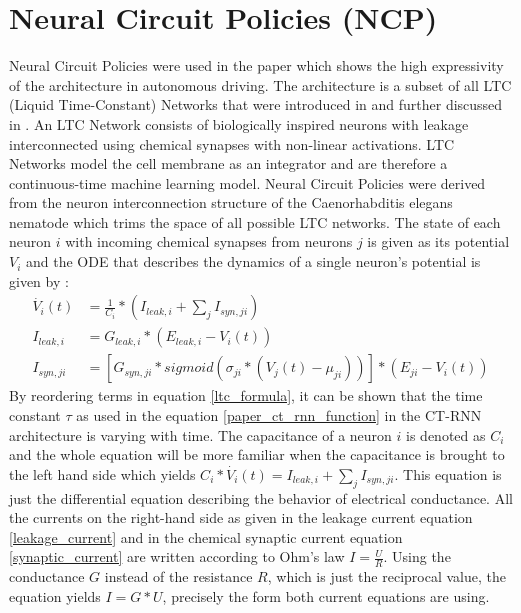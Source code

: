 \documentclass[draft,final]{vutinfth} %
\begin{document}
    \section{Neural Circuit Policies (NCP)} \label{ncp}
    Neural Circuit Policies were used in the paper \cite{NCP} which shows the high expressivity of the architecture in autonomous driving.
    The architecture is a subset of all LTC (Liquid Time-Constant) Networks that were introduced in \cite{LTCFormulas} and further discussed in \cite{LTCNetworks}.
    An LTC Network consists of biologically inspired neurons with leakage interconnected using chemical synapses with non-linear activations.
    LTC Networks model the cell membrane as an integrator and are therefore a continuous-time machine learning model.
    Neural Circuit Policies were derived from the neuron interconnection structure of the Caenorhabditis elegans nematode \cite[p. 3]{NCP} which trims the space of all possible LTC networks.
    The state of each neuron $i$ with incoming chemical synapses from neurons $j$ is given as its potential $V_i$ and the ODE that describes the dynamics of a single neuron's potential is given by \cite[p. 1-2]{LTCFormulas}:
    \begin{align}
        \label{ltc_formula}
        \dot{V_i}(t) &= \frac{1}{C_i} * (I_{leak,i} + \sum_j{I_{syn,ji}}) \\
        \label{leakage_current}
        I_{leak,i} &= G_{leak,i} * (E_{leak,i} - V_i(t)) \\
        \label{synaptic_current}
        I_{syn,ji} &= [G_{syn,ji} * sigmoid(\sigma_{ji}*(V_j(t)-\mu_{ji}))] * (E_{ji} - V_i(t))
    \end{align}
    By reordering terms in equation \ref{ltc_formula}, it can be shown that the time constant $\tau$ as used in the equation \ref{paper_ct_rnn_function} in the CT-RNN architecture is varying with time.
    The capacitance of a neuron $i$ is denoted as $C_i$ and the whole equation will be more familiar when the capacitance is brought to the left hand side which yields $C_i * \dot{V_i}(t) = I_{leak,i} + \sum_j{I_{syn,ji}}$.
    This equation is just the differential equation describing the behavior of electrical conductance.
    All the currents on the right-hand side as given in the leakage current equation \ref{leakage_current} and in the chemical synaptic current equation \ref{synaptic_current} are written according to Ohm's law $I = \frac{U}{R}$.
    Using the conductance $G$ instead of the resistance $R$, which is just the reciprocal value, the equation yields $I = G * U$, precisely the form both current equations are using.
\end{document}

